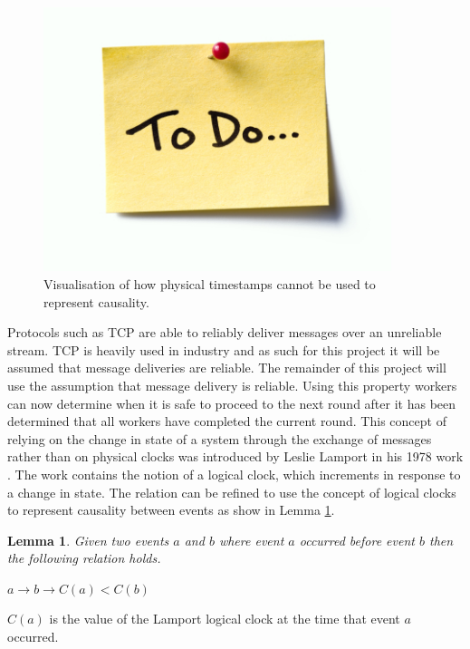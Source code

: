 \documentclass[12pt]{article}
\newtheorem{lemma}{Lemma}
\begin{document}
\begin{figure}[H]
  \centering
  \includegraphics[width=4in]{todo}
  \caption[]{Visualisation of how physical timestamps cannot be used to represent causality.}
  \label{MessageRetransmissoin}
\end{figure}

Protocols such as TCP are able to reliably deliver messages over an unreliable stream. TCP is heavily used in industry and as such for this project it will be assumed that message deliveries are reliable. The remainder of this project will use the assumption that message delivery is reliable. Using this property workers can now determine when it is safe to proceed to the next round after it has been determined that all workers have completed the current round.
\newline
\newline
This concept of relying on the change in state of a system through the exchange of messages rather than on physical clocks was introduced by Leslie Lamport in his 1978 work  \cite{lamport1978time}. The work contains the notion of a logical clock, which increments in response to a change in state. The  relation can be refined to use the concept of logical clocks to represent causality between events as show in Lemma \ref{LogicalOrderingLemma}.

\begin{lemma}
Given two events $a$ and $b$ where event $a$ occurred before event $b$ then the following relation holds.

$a \rightarrow b \longrightarrow C(a) < C(b)$
\label{LogicalOrderingLemma}
\end{lemma}
$C(a)$ is the value of the Lamport logical clock at the time that event $a$ occurred.
\newline
\end{document}

